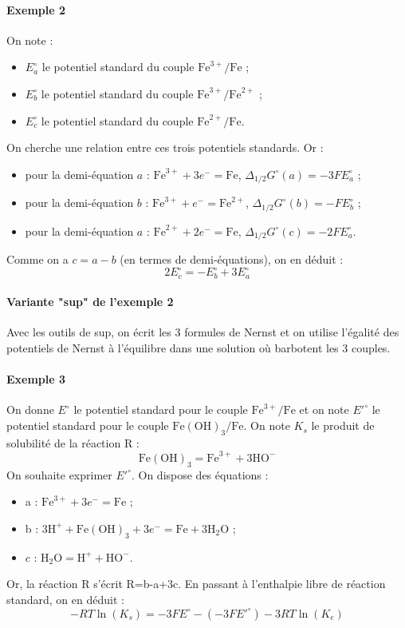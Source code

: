 \documentclass[french]{book}
\theoremstyle{plain}
\theoremstyle{definition}
\theoremstyle{remark}
\begin{document}
\paragraph{Exemple 2} On note : \begin{itemize}
	\item $E_a^\circ$ le potentiel standard du couple $\text{Fe}^{3+}/\text{Fe}$ ;
	\item $E_b^\circ$ le potentiel standard du couple $\text{Fe}^{3+}/\text{Fe}^{2+}$ ;
	\item $E_c^\circ$ le potentiel standard du couple $\text{Fe}^{2+}/\text{Fe}$.
\end{itemize} On cherche une relation entre ces trois potentiels standards. Or : \begin{itemize}
\item pour la demi-équation $a$ : $\text{Fe}^{3+}+3e^-=\text{Fe}$, $\Delta_{1/2}G^\circ(a)=-3FE_a^\circ$ ;
\item pour la demi-équation $b$ : $\text{Fe}^{3+}+e^-=\text{Fe}^{2+}$, $\Delta_{1/2}G^\circ(b)=-FE_b^\circ$ ;
\item pour la demi-équation $a$ : $\text{Fe}^{2+}+2e^-=\text{Fe}$, $\Delta_{1/2}G^\circ(c)=-2FE_a^\circ$.
\end{itemize} Comme on a $c=a-b$ (en termes de demi-équations), on en déduit : $$2E_c^\circ=-E_b^\circ+3E_a^\circ$$

\paragraph{Variante "sup" de l'exemple 2} Avec les outils de sup, on écrit les 3 formules de Nernst et on utilise l'égalité des potentiels de Nernst à l'équilibre dans une solution où barbotent les 3 couples.

\paragraph{Exemple 3} On donne $E^\circ$ le potentiel standard pour le couple $\text{Fe}^{3+}/\text{Fe}$ et on note $E'^\circ$ le potentiel standard pour le couple $\text{Fe}(\text{OH})_3/\text{Fe}$. On note $K_s$ le produit de solubilité de la réaction R : $$\text{Fe}(\text{OH})_3=\text{Fe}^{3+}+3\text{HO}^-$$ On souhaite exprimer $E'^\circ$. On dispose des équations : \begin{itemize}
	\item a : $\text{Fe}^{3+}+3e^-=\text{Fe}$ ;
	\item b : $3\text{H}^++\text{Fe}(\text{OH})_3+3e^-=\text{Fe}+3\text{H}_2\text{O}$ ;
	\item $c$ : $\text{H}_2\text{O}=\text{H}^++\text{HO}^-$.
\end{itemize} Or, la réaction R s'écrit R=b-a+3c. En passant à l'enthalpie libre de réaction standard, on en déduit : $$-RT\ln(K_s)=-3FE^\circ-(-3FE'^\circ)-3RT\ln(K_e)$$
\end{document}
